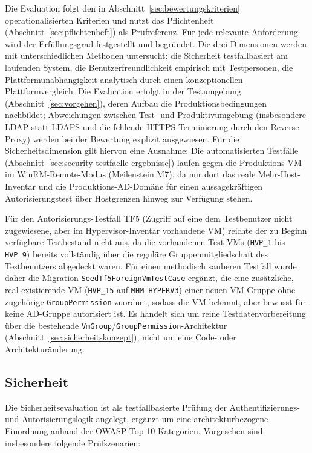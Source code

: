 \documentclass[12pt,a4paper]{article}
\begin{document}
Die Evaluation folgt den in Abschnitt~\ref{sec:bewertungskriterien} operationalisierten Kriterien und nutzt das Pflichtenheft (Abschnitt~\ref{sec:pflichtenheft}) als Prüfreferenz. Für jede relevante Anforderung wird der Erfüllungsgrad festgestellt und begründet. Die drei Dimensionen werden mit unterschiedlichen Methoden untersucht: die Sicherheit testfallbasiert am laufenden System, die Benutzerfreundlichkeit empirisch mit Testpersonen, die Plattformunabhängigkeit analytisch durch einen konzeptionellen Plattformvergleich. Die Evaluation erfolgt in der Testumgebung (Abschnitt~\ref{sec:vorgehen}), deren Aufbau die Produktionsbedingungen nachbildet; Abweichungen zwischen Test- und Produktivumgebung (insbesondere LDAP statt LDAPS und die fehlende HTTPS-Terminierung durch den Reverse Proxy) werden bei der Bewertung explizit ausgewiesen. Für die Sicherheitsdimension gilt hiervon eine Ausnahme: Die automatisierten Testfälle (Abschnitt~\ref{sec:security-testfaelle-ergebnisse}) laufen gegen die Produktions-VM im WinRM-Remote-Modus (Meilenstein M7), da nur dort das reale Mehr-Host-Inventar und die Produktions-AD-Domäne für einen aussagekräftigen Autorisierungstest über Hostgrenzen hinweg zur Verfügung stehen.

Für den Autorisierungs-Testfall TF5 (Zugriff auf eine dem Testbenutzer nicht zugewiesene, aber im Hypervisor-Inventar vorhandene VM) reichte der zu Beginn verfügbare Testbestand nicht aus, da die vorhandenen Test-VMs (\texttt{HVP\_1} bis \texttt{HVP\_9}) bereits vollständig über die reguläre Gruppenmitgliedschaft des Testbenutzers abgedeckt waren. Für einen methodisch sauberen Testfall wurde daher die Migration \texttt{SeedTf5ForeignVmTestCase} ergänzt, die eine zusätzliche, real existierende VM (\texttt{HVP\_15} auf \texttt{MHM-HYPERV3}) einer neuen VM-Gruppe ohne zugehörige \texttt{GroupPermission} zuordnet, sodass die VM bekannt, aber bewusst für keine AD-Gruppe autorisiert ist. Es handelt sich um reine Testdatenvorbereitung über die bestehende \texttt{VmGroup}/\texttt{GroupPermission}-Architektur (Abschnitt~\ref{sec:sicherheitskonzept}), nicht um eine Code- oder Architekturänderung.

\subsection{Sicherheit}

Die Sicherheitsevaluation ist als testfallbasierte Prüfung der Authentifizierungs- und Autorisierungslogik angelegt, ergänzt um eine architekturbezogene Einordnung anhand der OWASP-Top-10-Kategorien. Vorgesehen sind insbesondere folgende Prüfszenarien:
\end{document}

